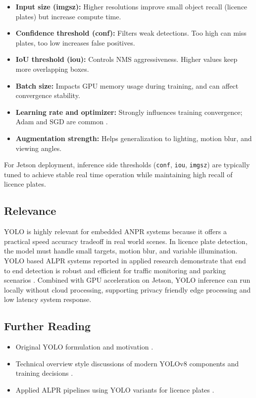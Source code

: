 \begin{itemize}
	\item \textbf{Input size (imgsz):} Higher resolutions improve small object recall (licence plates) but increase compute time.
	\item \textbf{Confidence threshold (conf):} Filters weak detections. Too high can miss plates, too low increases false positives.
	\item \textbf{IoU threshold (iou):} Controls NMS aggressiveness. Higher values keep more overlapping boxes.
	\item \textbf{Batch size:} Impacts GPU memory usage during training, and can affect convergence stability.
	\item \textbf{Learning rate and optimizer:} Strongly influences training convergence; Adam and SGD are common \cite{kingma2014adam}.
	\item \textbf{Augmentation strength:} Helps generalization to lighting, motion blur, and viewing angles.
\end{itemize}

For Jetson deployment, inference side thresholds (\texttt{conf}, \texttt{iou}, \texttt{imgsz}) are typically tuned to achieve stable real time operation while maintaining high recall of licence plates.

\subsection{Relevance}

YOLO is highly relevant for embedded ANPR systems because it offers a practical speed accuracy tradeoff in real world scenes. In licence plate detection, the model must handle small targets, motion blur, and variable illumination. YOLO based ALPR systems reported in applied research demonstrate that end to end detection is robust and efficient for traffic monitoring and parking scenarios \cite{yolov4lp_rg,anpr_yolov8_rg,yolo_alpr_end2end_rg}. Combined with GPU acceleration on Jetson, YOLO inference can run locally without cloud processing, supporting privacy friendly edge processing and low latency system response.

\subsection{Further Reading}

\begin{itemize}
	\item Original YOLO formulation and motivation \cite{redmon2016yolo}.
	\item Technical overview style discussions of modern YOLOv8 components and training decisions \cite{yaseen2024whatisyolov8}.
	\item Applied ALPR pipelines using YOLO variants for licence plates \cite{yolov4lp_rg,anpr_yolov8_rg,yolo_alpr_end2end_rg}.
\end{itemize}
